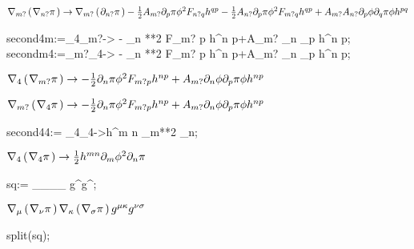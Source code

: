 \documentclass[10pt]{article}
\newcommand\brwrap[3]{%
  \setbox0=\hbox{$#2$}
  \left#1\vbox to \the\ht0{\hbox to 0pt{}}\right.\kern-.2em
  \begingroup #2\endgroup\kern-.15em
  \left.\vbox to \the\ht0{\hbox to 0pt{}}\right#3
}
\begin{document}
\begin{adjustwidth}{1em}{0cm}${}\nabla_{m?}\brwrap{(}{\nabla_{n?}{\pi}}{)} \rightarrow \nabla_{m?}\brwrap{(}{\partial_{n?}{\pi}}{)} - \frac{1}{2}A_{m?} \partial_{p}{\pi} {\phi}^{2} F_{n? q} h^{q p} - \frac{1}{2}A_{n?} \partial_{p}{\pi} {\phi}^{2} F_{m? q} h^{q p}+A_{m?} A_{n?} \partial_{p}{\phi} \partial_{q}{\pi} \phi h^{p q}$\end{adjustwidth}
\begin{python}
second4m:=\nabla_{4}{\nabla_{m?}{\pi}}->  - \partial_{n}{\pi} {\phi}**{2} F_{m? p} h^{n p}+A_{m?} \partial_{n}{\phi} \partial_{p}{\pi} \phi h^{n p};
secondm4:=\nabla_{m?}{\nabla_{4}{\pi}}->  - \partial_{n}{\pi} {\phi}**{2} F_{m? p} h^{n p}+A_{m?} \partial_{n}{\phi} \partial_{p}{\pi} \phi h^{n p};
\end{python}
\begin{adjustwidth}{1em}{0cm}${}\nabla_{4}\brwrap{(}{\nabla_{m?}{\pi}}{)} \rightarrow  - \frac{1}{2}\partial_{n}{\pi} {\phi}^{2} F_{m? p} h^{n p}+A_{m?} \partial_{n}{\phi} \partial_{p}{\pi} \phi h^{n p}$\end{adjustwidth}
\begin{adjustwidth}{1em}{0cm}${}\nabla_{m?}\brwrap{(}{\nabla_{4}{\pi}}{)} \rightarrow  - \frac{1}{2}\partial_{n}{\pi} {\phi}^{2} F_{m? p} h^{n p}+A_{m?} \partial_{n}{\phi} \partial_{p}{\pi} \phi h^{n p}$\end{adjustwidth}
\begin{python}
second44:= \nabla_{4}{\nabla_{4}{\pi}}->h^{m n} \partial_{m}{{\phi}**{2}} \partial_{n}{\pi};
\end{python}
\begin{adjustwidth}{1em}{0cm}${}\nabla_{4}\brwrap{(}{\nabla_{4}{\pi}}{)} \rightarrow \frac{1}{2}h^{m n} \partial_{m}{{\phi}^{2}} \partial_{n}{\pi}$\end{adjustwidth}
\begin{python}
sq:= \nabla_{\mu}{\nabla_{\nu}{\pi}}\nabla_{\kappa}{\nabla_{\sigma}{\pi}} g^{\mu \kappa}g^{\nu \sigma};
\end{python}
\begin{adjustwidth}{1em}{0cm}${}\nabla_{\mu}\brwrap{(}{\nabla_{\nu}{\pi}}{)} \nabla_{\kappa}\brwrap{(}{\nabla_{\sigma}{\pi}}{)} g^{\mu \kappa} g^{\nu \sigma}$\end{adjustwidth}
\begin{python}
split(sq);
\end{python}
\end{document}
